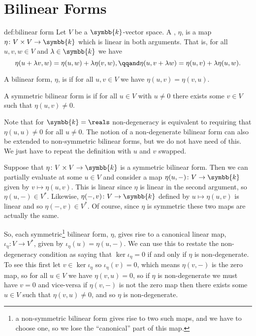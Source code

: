 \documentclass[fleqn]{NotesClass}
\renewcommand{\field}{\symbb{k}}
\begin{document}
    \section{Bilinear Forms}
    \begin{dfn}{}{def:bilinear form}
        Let \(V\) be a \(\field\)-vector space.
        A , \(\eta\), is a map \(\eta \colon V \times V \to \field\) which is linear in both arguments.
        That is, for all \(u, v, w \in V\) and \(\lambda \in \field\) we have
        \begin{equation}
            \eta(u + \lambda v, w) = \eta(u, w) + \lambda \eta(v, w), \qqand \eta(u, v + \lambda w) = \eta(u, v) + \lambda \eta(u, w).
        \end{equation}
        
        A bilinear form, \(\eta\), is  if for all \(u, v \in V\) we have \(\eta(u, v) = \eta(v, u)\).
        
        A symmetric bilinear form is  if for all \(u \in V\) with \(u \ne 0\) there exists some \(v \in V\) such that \(\eta(u, v) \ne 0\).
    \end{dfn}
    
    Note that for \(\field = \reals\) non-degeneracy is equivalent to requiring that \(\eta(u, u) \ne 0\) for all \(u \ne 0\).
    The notion of a non-degenerate bilinear form can also be extended to non-symmetric bilinear forms, but we do not have need of this.
    We just have to repeat the definition with \(u\) and \(v\) swapped.
    
    Suppose that \(\eta \colon V \times V \to \field\) is a symmetric bilinear form.
    Then we can partially evaluate at some \(u \in V\) and consider a map \(\eta(u, -) \colon V \to \field\) given by \(v \mapsto \eta(u, v)\).
    This is linear since \(\eta\) is linear in the second argument, so \(\eta(u, -) \in V^*\).
    Likewise, \(\eta(-, v) \colon V \to \field\) defined by \(u \mapsto \eta(u, v)\) is linear and so \(\eta(-, v) \in V^*\).
    Of course, since \(\eta\) is symmetric these two maps are actually the same.
    
    So, each symmetric\footnote{a non-symmetric bilinear form gives rise to two such maps, and we have to choose one, so we lose the \enquote{canonical} part of this map.} bilinear form, \(\eta\), gives rise to a canonical linear map, \(\iota_\eta \colon V \to V^*\), given by \(\iota_\eta(u) = \eta(u, -)\).
    We can use this to restate the non-degeneracy condition as saying that \(\ker \iota_\eta = 0\) if and only if \(\eta\) is non-degenerate.
    To see this first let \(v \in \ker \iota_\eta\) so \(\iota_\eta(v) = 0\), which means \(\eta(v, -)\) is the zero map, so for all \(u \in V\) we have \(\eta(v, u) = 0\), so if \(\eta\) is non-degenerate we must have \(v = 0\) and vice-versa if \(\eta(v, -)\) is not the zero map then there exists some \(u \in V\) such that \(\eta(v, u) \ne 0\), and so \(\eta\) is non-degenerate.
    
\end{document}
